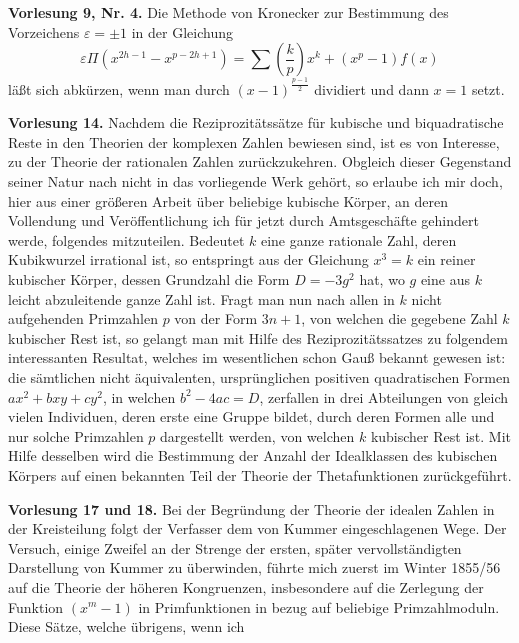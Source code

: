 \documentclass[11pt]{article}
\newcommand{\origpage}[1]{\par\vspace{0.25em}\noindent{\footnotesize\itshape [Gedruckte Seite #1]}\par\vspace{0.25em}}
\begin{document}
\origpage{417}
\textbf{Vorlesung 9, Nr. 4.} Die Methode von Kronecker zur Bestimmung des Vorzeichens $\varepsilon=\pm1$ in der Gleichung
\[
 \varepsilon\Pi(x^{2h-1}-x^{p-2h+1})=
 \sum \left(\frac{k}{p}\right)x^k+(x^p-1)f(x)
\]
läßt sich abkürzen, wenn man durch $(x-1)^{\frac{p-1}{2}}$ dividiert und dann $x=1$ setzt.

\textbf{Vorlesung 14.} Nachdem die Reziprozitätssätze für kubische und biquadratische Reste in den Theorien der komplexen Zahlen bewiesen sind, ist es von Interesse, zu der Theorie der rationalen Zahlen zurückzukehren. Obgleich dieser Gegenstand seiner Natur nach nicht in das vorliegende Werk gehört, so erlaube ich mir doch, hier aus einer größeren Arbeit über beliebige kubische Körper, an deren Vollendung und Veröffentlichung ich für jetzt durch Amtsgeschäfte gehindert werde, folgendes mitzuteilen. Bedeutet $k$ eine ganze rationale Zahl, deren Kubikwurzel irrational ist, so entspringt aus der Gleichung $x^3=k$ ein reiner kubischer Körper, dessen Grundzahl die Form $D=-3g^2$ hat, wo $g$ eine aus $k$ leicht abzuleitende ganze Zahl ist. Fragt man nun nach allen in $k$ nicht aufgehenden Primzahlen $p$ von der Form $3n+1$, von welchen die gegebene Zahl $k$ kubischer Rest ist, so gelangt man mit Hilfe des Reziprozitätssatzes zu folgendem interessanten Resultat, welches im wesentlichen schon Gauß bekannt gewesen ist: die sämtlichen nicht äquivalenten, ursprünglichen positiven quadratischen Formen $ax^2+bxy+cy^2$, in welchen $b^2-4ac=D$, zerfallen in drei Abteilungen von gleich vielen Individuen, deren erste eine Gruppe bildet, durch deren Formen alle und nur solche Primzahlen $p$ dargestellt werden, von welchen $k$ kubischer Rest ist. Mit Hilfe desselben wird die Bestimmung der Anzahl der Idealklassen des kubischen Körpers auf einen bekannten Teil der Theorie der Thetafunktionen zurückgeführt.

\textbf{Vorlesung 17 und 18.} Bei der Begründung der Theorie der idealen Zahlen in der Kreisteilung folgt der Verfasser dem von Kummer eingeschlagenen Wege. Der Versuch, einige Zweifel an der Strenge der ersten, später vervollständigten Darstellung von Kummer zu überwinden, führte mich zuerst im Winter 1855/56 auf die Theorie der höheren Kongruenzen, insbesondere auf die Zerlegung der Funktion $(x^m-1)$ in Primfunktionen in bezug auf beliebige Primzahlmoduln. Diese Sätze, welche übrigens, wenn ich
\end{document}
